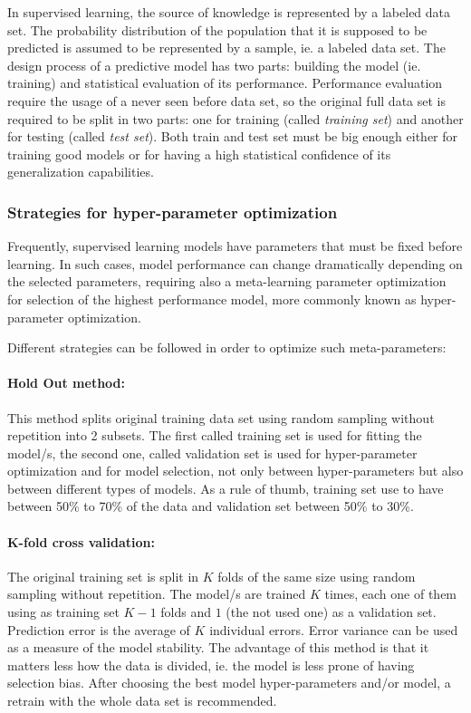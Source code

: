 In supervised learning, the source of knowledge is represented by a labeled data set. The probability distribution of the population that it is supposed to be predicted is assumed to be represented by a sample, ie. a labeled data set. The design process of a predictive model has two parts: building the model (ie. training) and statistical evaluation of its performance. Performance evaluation require the usage of a never seen before data set, so the original full data set is required to be split in two parts: one for training (called \emph{training set}) and another for testing (called \emph{test set}). Both train and test set must be big enough either for training good models or for having a high statistical confidence of its generalization capabilities.

\subsubsection{Strategies for hyper-parameter optimization}

Frequently, supervised learning models have parameters that must be fixed before learning. In such cases, model performance can change dramatically depending on the selected parameters, requiring also a meta-learning parameter optimization for selection of the highest performance model, more commonly known as hyper-parameter optimization. 

Different strategies can be followed in order to optimize such meta-parameters:

\paragraph{Hold Out method:} This method splits original training data set using random sampling without repetition into 2 subsets. The first called training set is used for fitting the model/s, the second one, called validation set is used for hyper-parameter optimization and for model selection, not only between hyper-parameters but also between different types of models. As a rule of thumb, training set use to have between 50\% to 70\% of the data and validation set between 50\% to 30\%.

\paragraph{K-fold cross validation:} The original training set is split in $K$ folds of the same size using random sampling without repetition. The model/s are trained $K$ times, each one of them using as training set $K-1$ folds and $1$ (the not used one) as a validation set. Prediction error is the average of $K$ individual errors. Error variance can be used as a measure of the model stability. The advantage of this method is that it matters less how the data is divided, ie. the model is less prone of having selection bias. After choosing the best model hyper-parameters and/or model, a retrain with the whole data set is recommended.

